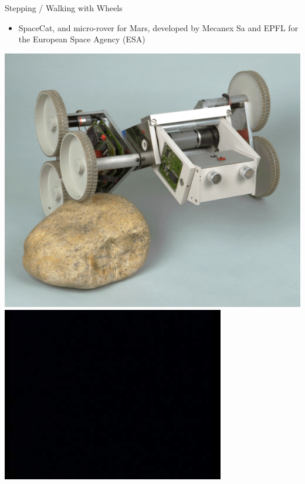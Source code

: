 \documentclass[compress]{beamer}
\begin{document}
\begin{frame}{Stepping / Walking with Wheels}

\begin{itemize}
    \item SpaceCat, and micro-rover for Mars, developed by Mecanex Sa and EPFL
  for the European Space Agency (ESA)
\end{itemize}

    \begin{center}
        \includegraphics[width=0.4\linewidth]{walkingwheels_ex1}
        \includegraphics[width=0.4\linewidth]{walkingwheels_ex2}
    \end{center}
\end{frame}
\end{document}

